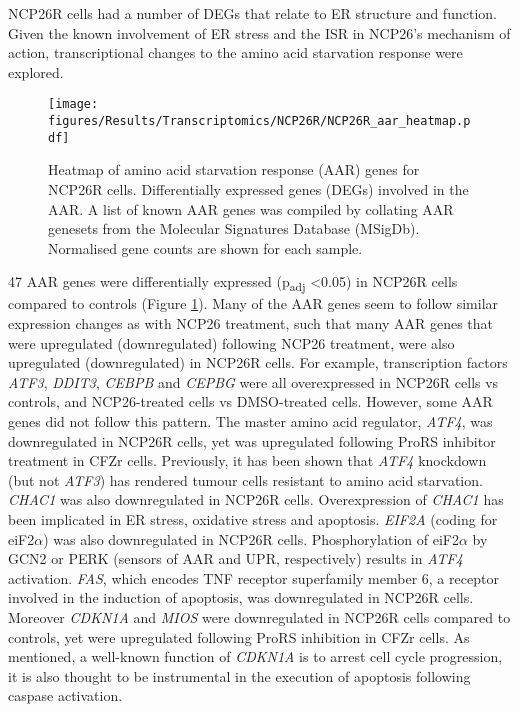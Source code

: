 NCP26R cells had a number of DEGs that relate to ER structure and function.
Given the known involvement of ER stress and the ISR in NCP26's mechanism of action, transcriptional changes to the amino acid starvation response were explored.
\begin{figure}[p]
\centering
\texttt{[image: figures/Results/Transcriptomics/NCP26R/NCP26R\_aar\_heatmap.pdf]}
\caption[Amino acid starvation response genes heatmap- NCP26R cells]{Heatmap of amino acid starvation response (AAR) genes for NCP26R cells.
Differentially expressed genes (DEGs) involved in the AAR.
A list of known AAR genes was compiled by collating AAR genesets from the Molecular Signatures Database (MSigDb).
Normalised gene counts are shown for each sample.
}
\label{fig:ncp26R_aar_heatmap}
\end{figure}
47 AAR genes were differentially expressed (p\textsubscript{adj} <0.05) in NCP26R cells compared to controls (Figure \ref{fig:ncp26R_aar_heatmap}).
Many of the AAR genes seem to follow similar expression changes as with NCP26 treatment, such that many AAR genes that were upregulated (downregulated) following NCP26 treatment, were also upregulated (downregulated) in NCP26R cells.
For example, transcription factors \textit{ATF3}, \textit{DDIT3}, \textit{CEBPB} and \textit{CEPBG} were all overexpressed in NCP26R cells vs controls, and NCP26-treated cells vs DMSO-treated cells.
However, some AAR genes did not follow this pattern.
The master amino acid regulator, \textit{ATF4}, was downregulated in NCP26R cells, yet was upregulated following ProRS inhibitor treatment in CFZr cells.
Previously, it has been shown that \textit{ATF4} knockdown (but not \textit{ATF3}) has rendered tumour cells resistant to amino acid starvation\cite{cheng2018arginine}.
\textit{CHAC1} was also downregulated in NCP26R cells.
Overexpression of \textit{CHAC1} has been implicated in ER stress, oxidative stress and apoptosis\cite{crawford2015human}.
\textit{EIF2A} (coding for eiF2$\alpha$) was also downregulated in NCP26R cells.
Phosphorylation of eiF2$\alpha$ by GCN2 or PERK (sensors of AAR and UPR, respectively) results in \textit{ATF4} activation.
\textit{FAS}, which encodes TNF receptor superfamily member 6, a receptor involved in the induction of apoptosis, was downregulated in NCP26R cells.
Moreover \textit{CDKN1A} and \textit{MIOS} were downregulated in NCP26R cells compared to controls, yet were upregulated following ProRS inhibition in CFZr cells.
As mentioned, a well-known function of \textit{CDKN1A} is to arrest cell cycle progression, it is also thought to be instrumental in the execution of apoptosis following caspase activation.

